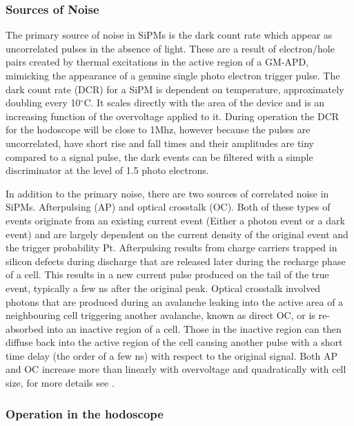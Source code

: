 \subsubsection*{Sources of Noise}

The primary source of noise in SiPMs is the dark count rate which appear as uncorrelated pulses in the absence of light. These are a result of electron/hole pairs created by thermal excitations in the active region of a GM-APD, mimicking the appearance of a genuine single photo electron trigger pulse. The dark count rate (DCR) for a SiPM is dependent on temperature, approximately doubling every 10$^{\circ}$C. It scales directly with the area of the device and is an increasing function of the overvoltage applied to it. During operation the DCR for the hodoscope will be close to 1Mhz, however because the pulses are uncorrelated, have short rise and fall times and their amplitudes are tiny compared to a signal pulse, the dark events can be filtered with a simple discriminator at the level of 1.5 photo electrons. \cite{website:AdvanSiDSiPMpdf}

In addition to the primary noise, there are two sources of correlated noise in SiPMs. Afterpulsing (AP) and optical crosstalk (OC). Both of these types of events originate from an existing current event (Either a photon event or a dark event) and are largely dependent on the current density of the original event and the trigger probability Pt. Afterpulsing results from charge carriers trapped in silicon defects during discharge that are released later during the recharge phase of a cell. This results in a new current pulse produced on the tail of the true event, typically a few ns after the original peak. Optical crosstalk involved photons that are produced during an avalanche leaking into the active area of a neighbouring cell triggering another avalanche, known as direct OC, or is re-absorbed into an inactive region of a cell. Those in the inactive region can then diffuse back into the active region of the cell causing another pulse with a short time delay (the order of a few ns) with respect to the original signal. Both AP and OC increase more than linearly with overvoltage and quadratically with cell size, for more details see \cite{gola2012sipm}.


\subsubsection*{Operation in the hodoscope}

